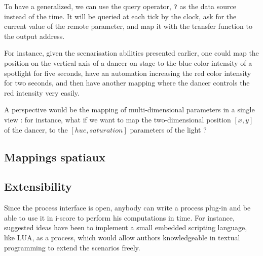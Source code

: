 \documentclass{sigchi}
\begin{document}
To have a generalized, we can use the query operator, \texttt{?} as the data source instead of the time. It will be queried at each tick by the clock, ask for the current value of the remote parameter, and map it with the transfer function to the output address.

For instance, given the scenarisation abilities presented earlier, one could map the position on the vertical axis of a dancer on stage to the blue color intensity of a spotlight for five seconds, have an automation increasing the red color intensity for  two seconds, and then have another mapping where the dancer controls the red intensity very easily.

A perspective would be the mapping of multi-dimensional parameters in a single view : for instance, what if we want to map the two-dimensional position $[x, y]$ of the dancer, to the $[hue, saturation]$ parameters of the light ?

\subsection{Mappings spatiaux}




    
\subsection{Extensibility}
Since the process interface is open, anybody can write a process plug-in and be able to use it in i-score to perform his computations in time. For instance, suggested ideas have been to implement a small embedded scripting language, like LUA, as a process, which would allow authors knowledgeable in textual programming to extend the scenarios freely.
\end{document}
